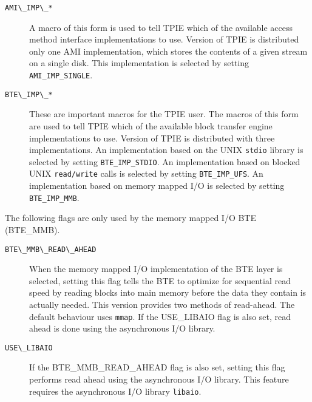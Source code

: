 \begin{description}
\item[{\verb|AMI\_IMP\_*|}]
  A macro of this form is used to tell TPIE which of the available
  access method interface implementations to use.  Version \version of
  TPIE is distributed only one AMI implementation, which stores the
  contents of a given stream on a single disk.  This implementation is
  selected by setting 
  {\tt AMI\_IMP\_SINGLE}.

\item[{\verb|BTE\_IMP\_*|}]
  These are important macros for the TPIE user.
  The macros of this form are used to tell TPIE which of the available
  block transfer engine implementations to use.  Version \version of
  TPIE is distributed with three implementations.  
  An implementation
  based on the UNIX {\tt stdio} library
   is selected
  by setting {\tt BTE\_IMP\_STDIO}.  
  An implementation based on blocked UNIX {\tt read/write} calls 
   is selected by setting 
  {\tt BTE\_IMP\_UFS}.
  An implementation based on memory
  mapped I/O is selected by setting 
  {\tt BTE\_IMP\_MMB}.

\end{description}

The following flags are only used by the memory mapped I/O BTE (BTE\_MMB).

\begin{description}

\item[{\verb|BTE\_MMB\_READ\_AHEAD|}]
  When the memory mapped I/O implementation of the BTE layer is
  selected, setting this flag tells the BTE to optimize for sequential
  read speed by reading blocks into main memory before the
  data they contain is actually needed. This version provides two methods
  of read-ahead. The default behaviour uses {\tt mmap}. If the USE\_LIBAIO
  flag is also set, read ahead is done using the asynchronous I/O library.
\item[{\verb|USE\_LIBAIO|}]
  If the BTE\_MMB\_READ\_AHEAD flag is also set, setting this flag
  performs read ahead using the  asynchronous I/O library.
  This feature requires the
  asynchronous I/O library {\tt libaio}.
\end{description}

